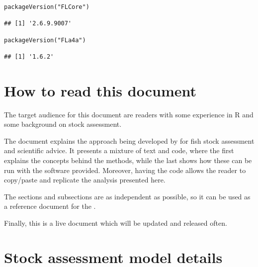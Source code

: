 \documentclass[a4paper,english,10pt]{article}\usepackage[]{graphicx}\usepackage[]{color}
\makeatletter
\newcommand{\hlstr}[1]{\textcolor[rgb]{0.063,0.58,0.627}{#1}}%
\newcommand{\hlstd}[1]{\textcolor[rgb]{0.196,0.196,0.196}{#1}}%
\newcommand{\hlkwd}[1]{\textcolor[rgb]{0.78,0.227,0.412}{#1}}%
\newenvironment{kframe}{%
 \def\at@end@of@kframe{}%
 \ifinner\ifhmode%
  \def\at@end@of@kframe{\end{minipage}}%
  \begin{minipage}{\columnwidth}%
 \fi\fi%
 \def\FrameCommand##1{\hskip\@totalleftmargin \hskip-\fboxsep
 \colorbox{shadecolor}{##1}\hskip-\fboxsep
     \hskip-\linewidth \hskip-\@totalleftmargin \hskip\columnwidth}%
 \MakeFramed {\advance\hsize-\width
   \@totalleftmargin\z@ \linewidth\hsize
   \@setminipage}}%
 {\par\unskip\endMakeFramed%
 \at@end@of@kframe}
\newenvironment{knitrout}{}{} %
\makeatother
\begin{document}
\begin{knitrout}
\color{fgcolor}\begin{kframe}
\begin{alltt}
\hlkwd{packageVersion}\hlstd{(}\hlstr{"FLCore"}\hlstd{)}
\end{alltt}
\begin{verbatim}
## [1] '2.6.9.9007'
\end{verbatim}
\begin{alltt}
\hlkwd{packageVersion}\hlstd{(}\hlstr{"FLa4a"}\hlstd{)}
\end{alltt}
\begin{verbatim}
## [1] '1.6.2'
\end{verbatim}
\end{kframe}
\end{knitrout}



\section{How to read this document}

The target audience for this document are readers with some experience in R and some background on stock assessment.

The document explains the approach being developed by \aFa for fish stock assessment and scientific advice. It presents a mixture of text and code, where the first explains the concepts behind the methods, while the last shows how these can be run with the software provided. Moreover, having the code allows the reader to copy/paste and replicate the analysis presented here.

The sections and subsections are as independent as possible, so it can be used as a reference document for the . 



Finally, this is a live document which will be updated and released often.



\section{Stock assessment model details}
\end{document}
